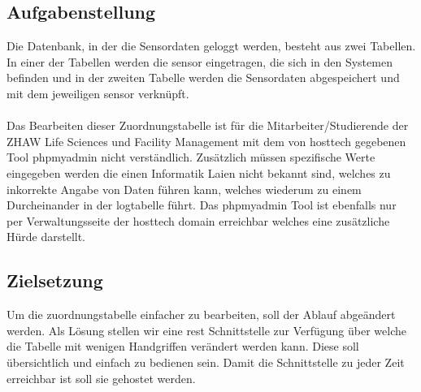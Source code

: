 \documentclass[../main.tex]{subfiles}
\begin{document}
	\subsection{Aufgabenstellung}
	Die Datenbank, in der die Sensordaten geloggt werden, besteht aus zwei Tabellen. In einer der Tabellen werden die \gls{sensor} eingetragen, die sich in den Systemen befinden und in der zweiten Tabelle werden die Sensordaten abgespeichert und mit dem jeweiligen \gls{sensor} verknüpft. \\
	\\	
	Das Bearbeiten dieser Zuordnungstabelle ist für die Mitarbeiter/Studierende der ZHAW Life Sciences und Facility Management mit dem von \gls{hosttech} gegebenen Tool \gls{phpmyadmin} nicht verständlich. Zusätzlich müssen spezifische Werte eingegeben werden die einen Informatik Laien nicht bekannt sind, welches zu inkorrekte Angabe von Daten führen kann, welches wiederum zu einem Durcheinander in der \gls{logtabelle} führt. 
	Das \gls{phpmyadmin} Tool ist ebenfalls nur per Verwaltungsseite der \gls{hosttech} \gls{domain} erreichbar welches eine zusätzliche Hürde darstellt.
	
	\subsection{Zielsetzung}
	Um die \gls{zuordnungstabelle} einfacher zu bearbeiten, soll der Ablauf abgeändert werden. Als Lösung stellen wir eine \gls{rest} Schnittstelle zur Verfügung über welche die Tabelle mit wenigen Handgriffen verändert werden kann. 
	Diese soll übersichtlich und einfach zu bedienen sein. Damit die Schnittstelle zu jeder Zeit erreichbar ist soll sie gehostet werden.
\end{document}
